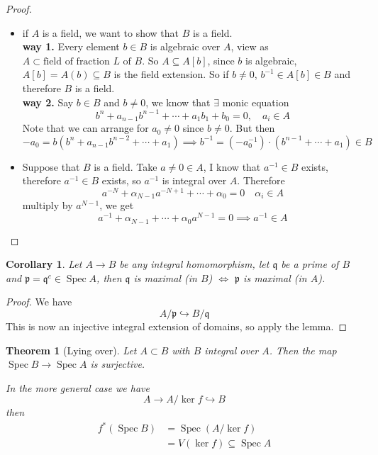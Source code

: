 \documentclass[11pt,a4paper]{article}
\theoremstyle{definition}
\theoremstyle{plain}
\newtheorem{theorem}[definition]{Theorem}
\newtheorem{corollary}[definition]{Corollary}
\theoremstyle{remark}
\newcommand{\Spec}{\operatorname{Spec}}
\begin{document}
\begin{proof}
    \begin{itemize}
        \item[$\implies$] if $A$ is a field, we want to show that $B$ is a field. \\
        \textbf{way 1.} Every element $b \in B$ is algebraic over $A$, view as $A \subset \text{field of fraction $L$ of $B$}$. So $A \subseteq A[b]$, since 
        $b$ is algebraic, $A[b] = A(b) \subseteq B$ is the field extension. So if $b \ne 0$, $b^{-1} \in A[b] \in B$ and therefore 
        $B$ is a field. \\
        \textbf{way 2.} Say $b \in B$ and $b \ne 0$, we know that $\exists$ monic equation 
        $$b^n + a_{n-1} b^{n-1} + \cdots + a_1 b_1 + b_0 = 0, \quad a_i \in A$$
        Note that we can arrange for $a_0 \ne 0$ since $b \ne 0$. But then 
        $$-a_0 = b \left(b^n + a_{n-1} b^{n-2} + \cdots + a_1\right) \implies b^{-1} = (-a_0^{-1}) \cdot (b^{n-1} + \cdots + a_1) \in B$$
        
        \item[$\impliedby$] Suppose that $B$ is a field. Take $a \ne 0 \in A$, I know that $a^{-1} \in B$ exists, therefore 
        $a^{-1} \in B$ exists, so $a^{-1}$ is integral over $A$. Therefore 
        $$a^{-N} + \alpha_{N-1} a^{-N+1} + \cdots + \alpha_0 = 0 \quad \alpha_i \in A$$
        multiply by $a^{N-1}$, we get 
        $$a^{-1} + \alpha_{N-1} + \cdots + \alpha_0 a^{N-1} = 0 \implies a^{-1} \in A$$
    \end{itemize}
\end{proof}

\begin{corollary}
    Let $A \to B$ be any integral homomorphism, let $\mathfrak{q}$ be a prime of $B$ and $\mathfrak{p} = \mathfrak{q}^c \in \Spec A$, then 
    $\mathfrak{q}$ is maximal (in $B$) $\iff$ $\mathfrak{p}$ is maximal (in $A$).
\end{corollary}

\begin{proof}
    We have 
    $$A/\mathfrak{p} \hookrightarrow B/\mathfrak{q}$$
    This is now an injective integral extension of domains, so apply the lemma. 
\end{proof}

\begin{theorem}[Lying over]
    Let $A \subset B$ with $B$ integral over $A$. Then the map $\Spec B \to \Spec A$ is surjective.

    In the more general case we have 
    $$A \to A / \ker f \hookrightarrow B$$
    then 
    \begin{align*}
        f^*(\Spec B) &= \Spec (A/\ker f) \\
        &= V(\ker f) \subseteq \Spec A
    \end{align*}
\end{theorem}
\end{document}
